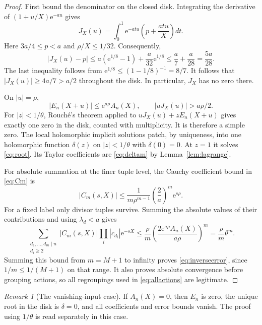 \documentclass[11pt,a4paper]{article}
\numberwithin{equation}{section}
\theoremstyle{definition}
\theoremstyle{remark}
\newtheorem{remark}[theorem]{Remark}
\newcommand{\ee}{\mathrm e}
\begin{document}
\begin{proof}
First bound the denominator on the closed disk. Integrating the
derivative of $(1+u/X)\ee^{-au}$ gives
\begin{equation}
 J_X(u)=\int_0^1\ee^{-atu}\left(p+\frac{atu}{X}\right)dt.
 \label{eq:Jintegral}
\end{equation}
Here $3a/4\le p<a$ and $\rho/X\le1/32$. Consequently,
\[
 |J_X(u)-p|
 \le a(\ee^{1/8}-1)+\frac a{32}\ee^{1/8}
 \le\frac a7+\frac a{28}=\frac{5a}{28}.
\]
The last inequality follows from $\ee^{1/8}\le(1-1/8)^{-1}=8/7$.
It follows that $|J_X(u)|\ge4a/7>a/2$ throughout the disk. In
particular, $J_X$ has no zero there.

On $|u|=\rho$,
\[
 |E_n(X+u)|\le\ee^{a\rho}A_n(X),\qquad
 |uJ_X(u)|>a\rho/2.
\]
For $|z|<1/\theta$, Rouch\'e's theorem applied to
$uJ_X(u)+zE_n(X+u)$ gives exactly one zero in the disk, counted with
multiplicity. It is therefore a simple zero. The local holomorphic
implicit solutions patch, by uniqueness, into one holomorphic function
$\delta(z)$ on $|z|<1/\theta$ with $\delta(0)=0$.
At $z=1$ it solves \eqref{eq:root}. Its Taylor coefficients are
\eqref{eq:deltam} by Lemma~\ref{lem:lagrange}.

For absolute summation at the finer tuple level, the Cauchy coefficient
bound in \eqref{eq:Cm} is
\begin{equation}
 |C_m(s,X)|\le\frac1{m\rho^{m-1}}
 \left(\frac2a\right)^m\ee^{s\rho}.
 \label{eq:Cbound}
\end{equation}
For a fixed label only divisor tuples survive. Summing the absolute
values of their contributions and using $\lambda_d<a$ gives
\[
 \sum_{\substack{d_1,\ldots,d_m\mid n\\d_i\ge2}}
 |C_m(s,X)|\prod_i|c_{d_i}|\ee^{-sX}
 \le\frac\rho m\left(
 \frac{2\ee^{a\rho}A_n(X)}{a\rho}\right)^m
 =\frac\rho m\theta^m.
\]
Summing this bound from $m=M+1$ to infinity proves
\eqref{eq:inverseerror}, since $1/m\le1/(M+1)$ on that range.
It also proves absolute convergence before grouping actions, so all
regroupings used in \eqref{eq:allactions} are legitimate.
\end{proof}

\begin{remark}[The vanishing-input case]
If $A_n(X)=0$, then $E_n$ is zero, the unique root in the disk is
$\delta=0$, and all coefficients and error bounds vanish. The proof
using $1/\theta$ is read separately in this case.
\end{remark}
\end{document}
